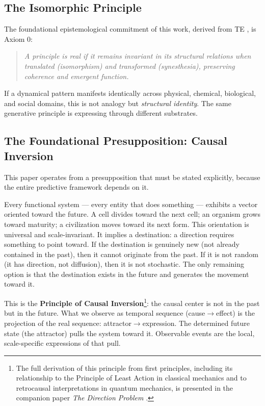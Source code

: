 \documentclass[12pt,a4paper]{article}
\begin{document}
\subsection{The Isomorphic Principle}

The foundational epistemological commitment of this work, derived from TE \cite{te_core}, is Axiom 0:

\begin{quote}
\emph{A principle is real if it remains invariant in its structural relations when translated (isomorphism) and transformed (synesthesia), preserving coherence and emergent function.}
\end{quote}

If a dynamical pattern manifests identically across physical, chemical, biological, and social domains, this is not analogy but \emph{structural identity}. The same generative principle is expressing through different substrates.

\subsection{The Foundational Presupposition: Causal Inversion}

This paper operates from a presupposition that must be stated explicitly, because the entire predictive framework depends on it.

Every functional system --- every entity that does something --- exhibits a vector oriented toward the future. A cell divides toward the next cell; an organism grows toward maturity; a civilization moves toward its next form. This orientation is universal and scale-invariant. It implies a destination: a direction requires something to point toward. If the destination is genuinely new (not already contained in the past), then it cannot originate from the past. If it is not random (it has direction, not diffusion), then it is not stochastic. The only remaining option is that the destination exists in the future and generates the movement toward it.

This is the \textbf{Principle of Causal Inversion}\footnote{The full derivation of this principle from first principles, including its relationship to the Principle of Least Action in classical mechanics and to retrocausal interpretations in quantum mechanics, is presented in the companion paper \emph{The Direction Problem} \cite{ghioni2026direction}.}: the causal center is not in the past but in the future. What we observe as temporal sequence (cause$\to$effect) is the projection of the real sequence: attractor$\to$expression. The determined future state (the attractor) pulls the system toward it. Observable events are the local, scale-specific expressions of that pull.
\end{document}
